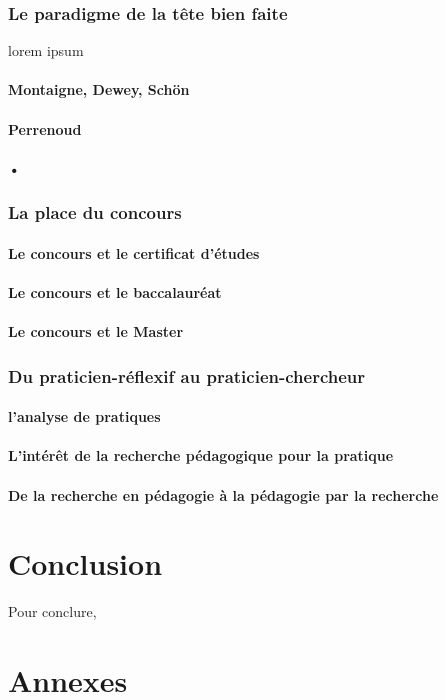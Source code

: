 \documentclass[a4paper,11pt]{article}
\begin{document}
\section{Le paradigme de la tête bien faite}
lorem ipsum
			\subsection{Montaigne, Dewey, Schön}
			\subsection{Perrenoud}
			\subsection{•}


\section{La place du concours}

			\subsection{Le concours et le certificat d'études}
			\subsection{Le concours et le baccalauréat}
			\subsection{Le concours et le Master}
			
\section{Du praticien-réflexif au praticien-chercheur}

			\subsection{l'analyse de pratiques}
			\subsection{L'intérêt de la recherche pédagogique pour la pratique}
			\subsection{De la recherche en pédagogie à la pédagogie par la recherche}



\part*{Conclusion}
Pour conclure,


\part*{Annexes}
\label{annexe1}

\nocite{*}


\end{document}
